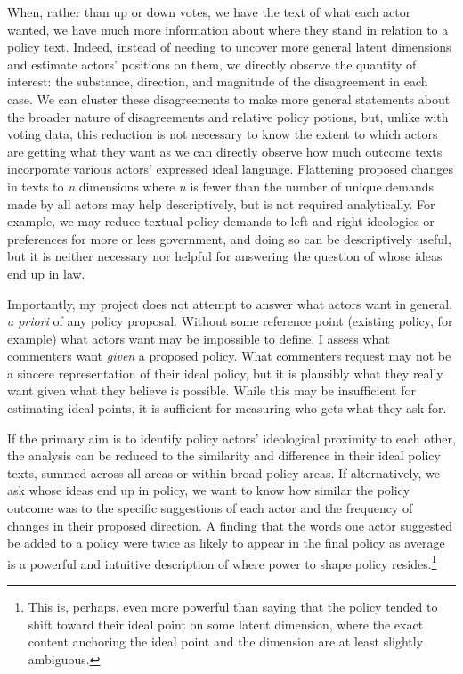 When, rather than up or down votes, we have the text of what each actor wanted, we have much more information about where they stand in relation to a policy text. Indeed, instead of needing to uncover more general latent dimensions and estimate actors' positions on them, we directly observe the quantity of interest: the substance, direction, and magnitude of the disagreement in each case. We can cluster these disagreements to make more general statements about the broader nature of disagreements and relative policy potions, but, unlike with voting data, this reduction is not necessary to know the extent to which actors are getting what they want as we can directly observe how much outcome texts incorporate various actors' expressed ideal language. Flattening proposed changes in texts to \textit{n} dimensions where \textit{n} is fewer than the number of unique demands made by all actors may help descriptively, but is not required analytically. For example, we may reduce textual policy demands to left and right ideologies or preferences for more or less government, and doing so can be descriptively useful, but it is neither necessary nor helpful for answering the question of whose ideas end up in law.

Importantly, my project does not attempt to answer what actors want in general, \textit{a priori} of any policy proposal. Without some reference point (existing policy, for example) what actors want may be impossible to define. I assess what commenters want \textit{given} a proposed policy. What commenters request may not be a sincere representation of their ideal policy, but it is plausibly what they really want given what they believe is possible. While this may be insufficient for estimating ideal points, it is sufficient for measuring who gets what they ask for. 

If the primary aim is to identify policy actors' ideological proximity to each other, the analysis can be reduced to the similarity and difference in their ideal policy texts, summed across all areas or within broad policy areas. If alternatively, we ask whose ideas end up in policy, we want to know how similar the policy outcome was to the specific suggestions of each actor and the frequency of changes in their proposed direction.%
A finding that the words one actor suggested be added to a policy were twice as likely to appear in the final policy as average is a powerful and intuitive description of where power to shape policy resides.\footnote{This is, perhaps, even more powerful than saying that the policy tended to shift toward their ideal point on some latent dimension, where the exact content anchoring the ideal point and the dimension are at least slightly ambiguous.}

